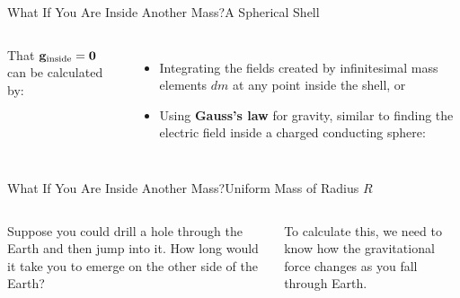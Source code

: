 \documentclass[12pt,compress,aspectratio=169]{beamer}
\newcommand{\mb}[1]{\ensuremath\mathbf{#1}}
\newcommand{\eq}[2]{\vspace{#1}{\Large\begin{displaymath}#2\end{displaymath}}}
\begin{document}
\begin{frame}{What If You Are Inside Another Mass?}{A Spherical Shell}
  \begin{columns}

    That $\mb{g}_{\textrm{inside}}=\mb{0}$ can be calculated by:
    \begin{itemize}
    \item Integrating the fields created by infinitesimal mass elements $dm$ at
      any point inside the shell, or
    \item Using \textbf{Gauss's law} for gravity, similar to finding the
      electric field inside a charged conducting sphere:
      
      \eq{-.2in}{
        \oint\mb{g}\cdot d\mb{A}=-4\pi GM_{\textrm{encl}}
      }
    \end{itemize}
  \end{columns}
\end{frame}



\begin{frame}{What If You Are Inside Another Mass?}{Uniform Mass of Radius $R$}
  \begin{columns}


    Suppose you could drill a hole through the Earth and then jump into it. How
    long would it take you to emerge on the other side of the Earth?

    \vspace{.2in}To calculate this, we need to know how the gravitational force
    changes as you fall through Earth.
  \end{columns}
\end{frame}
\end{document}
